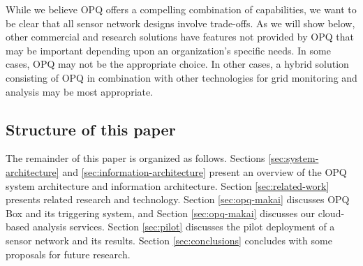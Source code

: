 While we believe OPQ offers a compelling combination of capabilities, we want to be clear that all sensor network designs involve trade-offs. As we will show below, other commercial and research solutions have features not provided by OPQ that may be important depending upon an organization's specific needs. In some cases, OPQ may not be the appropriate choice. In other cases, a hybrid solution consisting of OPQ in combination with other technologies for grid monitoring and analysis may be most appropriate.

\subsection{Structure of this paper}

The remainder of this paper is organized as follows. Sections \ref{sec:system-architecture} and \ref{sec:information-architecture} present an overview of the OPQ system architecture and information architecture. Section \ref{sec:related-work} presents related research and technology.  Section \ref{sec:opq-makai} discusses OPQ Box and its triggering system, and Section \ref{sec:opq-makai} discusses our cloud-based analysis services. Section \ref{sec:pilot} discusses the pilot deployment of a sensor network and its results. Section \ref{sec:conclusions} concludes with some proposals for future research.



